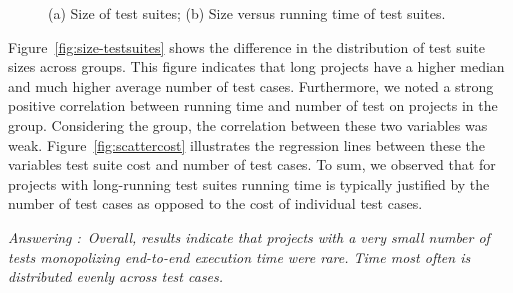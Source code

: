 \begin{figure}[t!]%
  \centering
  \qquad
  \vspace{-2mm}
  \caption{\label{fig:time-versus-size}(a) Size of test suites; (b)
    Size versus running time of test suites.}%
  \vspace{-5mm}
\end{figure}

Figure~\ref{fig:size-testsuites} shows the difference in the
distribution of test suite sizes across groups.  This figure indicates
that long projects have a higher median and much higher average number of test cases.
Furthermore, we noted a strong positive correlation between running
time and number of test on projects in the \longg{} group.
Considering the \medg{} group, the correlation between these two
variables was weak.
Figure~\ref{fig:scattercost} illustrates the regression lines between
these the variables test suite cost and number of test cases.
To sum, we observed that for projects with long-running test suites
running time is typically
justified by the number of test cases as opposed to the cost of individual test cases.

\begin{mdframed}
  \noindent\textit{Answering \numRQFeasibilityTwo{}:}~\emph{Overall, results indicate that
  projects with a very small number of tests monopolizing end-to-end
  execution time were rare. Time most often is distributed evenly
  across test cases.}
\end{mdframed}

